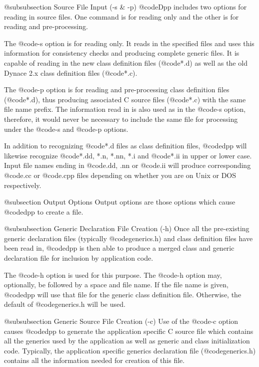 @subsubsection Source File Input (-s & -p)
@code{Dpp} includes two options for reading in source files.  One
command is for reading only and the other is for reading and
pre-processing.

The @code{-s} option is for reading only.  It reads in the specified
files and uses this information for consistency checks and producing
complete generic files.  It is capable of reading in the new
class definition files (@code{*.d}) as well as the old Dynace 2.x
class definition files (@code{*.c}).

The @code{-p} option is for reading and pre-processing class
definition files (@code{*.d}), thus producing associated
C source files (@code{*.c}) with the same file name prefix.
The information read in is also used as in the @code{-s} option,
therefore, it would never be necessary to include the same
file for processing under the @code{-s} and @code{-p} options.

In addition to recognizing @code{*.d} files as class definition files,
@code{dpp} will likewise recognize @code{*.dd, *.n, *.nn, *.i} and
@code{*.ii} in upper or lower case.  Input file names ending in
@code{.dd, .nn} or @code{.ii} will produce corresponding @code{.cc} or
@code{.cpp} files depending on whether you are on Unix or DOS
respectively.

@subsection Output Options
Output options are those options which cause @code{dpp} to create
a file.

@subsubsection Generic Declaration File Creation (-h)
Once all the pre-existing generic declaration files (typically
@code{generics.h}) and class definition files have been read in,
@code{dpp} is then able to produce a merged class and generic
declaration file for inclusion by application code.

The @code{-h} option is used for this purpose.  The @code{-h} option
may, optionally, be followed by a space and file name.  If the file name
is given, @code{dpp} will use that file for the generic class definition
file.  Otherwise, the default of @code{generics.h} will be used.

@subsubsection Generic Source File Creation (-c)
Use of the @code{-c} option causes @code{dpp} to generate the
application specific C source file which contains all the
generics used by the application as well as generic and class
initialization code.  Typically, the application specific
generics declaration file (@code{generics.h}) contains
all the information needed for creation of this file.

